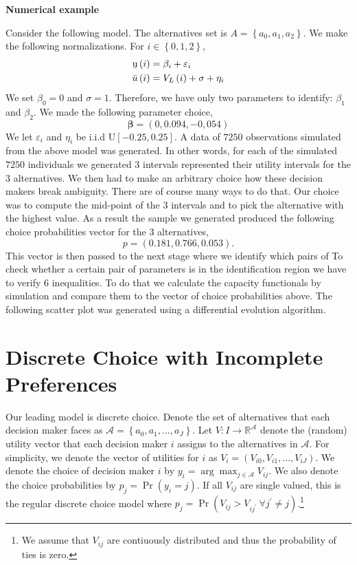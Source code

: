 \documentclass[reqno]{article}
\begin{document}
\textbf{Numerical example}

Consider the following model. The alternatives set is $A=\left\{
a_{0},a_{1},a_{2}\right\} \text{.}$ We make the following normalizations.
For $i\in \left\{ 0,1,2\right\} \text{,}$ 
\begin{align}
\text{\b{u}}\left( i\right) & =\beta _{i}+\varepsilon _{i} \\
\bar{u}\left( i\right) & =V_{L}\left( i\right) +\sigma +\eta _{i}
\end{align}%
We set $\beta _{0}=0$ and $\sigma =1$. Therefore, we have only two
parameters to identify: $\beta _{1}$ and $\beta _{2}$. We made the following
parameter choice,%
\begin{equation}
\mathbf{\beta }=\left( 0,0.094,-0,054\right)
\end{equation}%
We let $\varepsilon _{i}$ and $\eta _{i}$ be i.i.d U$\left[ -0.25,0.25\right]
$. A data of $7250$ observations simulated from the above model was
generated. In other words, for each of the simulated $7250$ individuals we
generated $3$ intervals represented their utility intervals for the $3$
alternatives. We then had to make an arbitrary choice how these decision
makers break ambiguity. There are of course many ways to do that. Our choice
was to compute the mid-point of the $3$ intervals and to pick the
alternative with the highest value. As a result the sample we generated
produced the following choice probabilities vector for the $3$ alternatives,%
\begin{equation}
p=\left( 0.181,0.766,0.053\right) .
\end{equation}%
This vector is then passed to the next stage where we identify which pairs
of To check whether a certain pair of parameters is in the identification
region we have to verify $6$ inequalities. To do that we calculate the
capacity functionals by simulation and compare them to the vector of choice
probabilities above. The following scatter plot was generated using a
differential evolution algorithm.


\section{Discrete Choice with Incomplete Preferences}\label{DiscreteChoice}

Our leading model is discrete choice. Denote the set of alternatives that
each decision maker faces as $\mathcal{A}=\left\{
a_{0},a_{1},...,a_{J}\right\} $. Let $V:I\rightarrow \mathbb{R}^{\mathcal{A}}$ denote the (random) utility vector that each decision maker $i$ assigns to the alternatives in $\mathcal{A}$. For simplicity, we denote the vector of utilities for $i$ as $V_{i}=\left( V_{i0},V_{i1},...,V_{iJ}\right) $. We denote the choice of decision maker $i$ by $y_{i}=\arg \max_{j\in \mathcal{A}}V_{ij}$. We also denote the choice
probabilities by $p_{j}=\Pr \left( y_{i}=j\right) $. If all $V_{ij}$ are
single valued, this is the regular discrete choice model where $p_{j}=\Pr
\left( V_{ij}>V_{ij^{\prime }}\ \forall j^{\prime }\neq j\right) $.\footnote{%
We assume that $V_{ij}$ are contiuously distributed and thus the probability
of ties is zero.}
\end{document}
